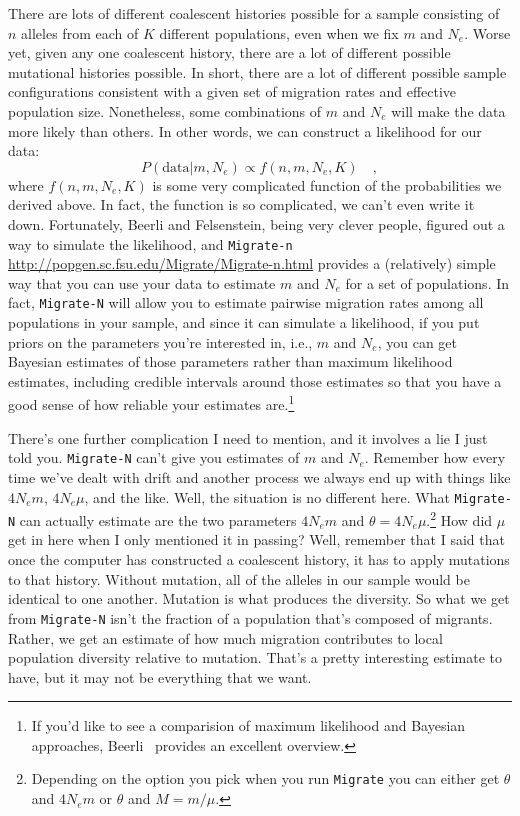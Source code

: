 There are lots of different coalescent histories possible for a sample
consisting of $n$ alleles from each of $K$ different populations, even
when we fix $m$ and $N_e$. Worse yet, given any one coalescent
history, there are a lot of different possible mutational histories
possible. In short, there are a lot of different possible sample
configurations consistent with a given set of migration rates and
effective population size. Nonetheless, some combinations of $m$ and
$N_e$ will make the data more likely than others. In other words, we
can construct a likelihood for our data:
\[
P(\mbox{data}|m, N_e) \propto f(n, m, N_e, K) \quad ,
\]
where $f(n, m, N_e,K)$ is some very complicated function of the
probabilities we derived above. In fact, the function is so
complicated, we can't even write it down. Fortunately, Beerli and
Felsenstein, being very clever people, figured out a way to simulate
the likelihood, and {\tt Migrate-n}
\url{http://popgen.sc.fsu.edu/Migrate/Migrate-n.html} provides a
(relatively) simple way that you can use your data to estimate $m$ and
$N_e$ for a set of populations. In fact, {\tt Migrate-N} will allow
you to estimate pairwise migration rates among all populations in your
sample, and since it can simulate a likelihood, if you put priors on
the parameters you're interested in, i.e., $m$ and $N_e$, you can get
Bayesian estimates of those parameters rather than maximum likelihood
estimates, including credible intervals around those estimates so that
you have a good sense of how reliable your estimates are.\footnote{If
  you'd like to see a comparision of maximum likelihood and Bayesian
  approaches, Beerli~\cite{Beerli-2006} provides an excellent
  overview.}

There's one further complication I need to mention, and it involves a
lie I just told you. {\tt Migrate-N} can't give you estimates of $m$
and $N_e$. Remember how every time we've dealt with drift and another
process we always end up with things like $4N_em$, $4N_e\mu$, and the
like. Well, the situation is no different here. What {\tt Migrate-N} can
actually estimate are the two parameters $4N_em$ and
$\theta=4N_e\mu$.\footnote{Depending on the option you pick when you
  run {\tt Migrate} you can either get $\theta$ and $4N_em$ or
  $\theta$ and $M=m/\mu$.} How did $\mu$ get in here when I only
mentioned it in passing? Well, remember that I said that once the
computer has constructed a coalescent history, it has to apply
mutations to that history. Without mutation, all of the alleles in our
sample would be identical to one another. Mutation is what 
produces the diversity. So what we get from {\tt Migrate-N} isn't the
fraction of a population that's composed of migrants. Rather, we get
an estimate of how much migration contributes to local population
diversity relative to mutation. That's a pretty interesting estimate
to have, but it may not be everything that we want.

